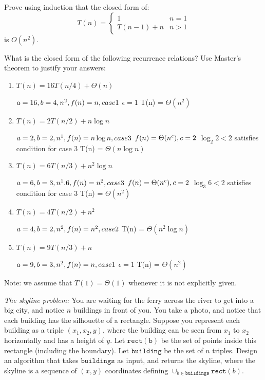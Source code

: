\documentclass{article}
\begin{document}
\nextprob
Prove using induction that the closed form of:
$$T(n) = \begin{cases}
            1        & n=1\\
            T(n-1)+n & n>1
         \end{cases}
$$
is $O(n^2)$.

\nextprob
What is the closed form of the following recurrence relations?  Use Master's
theorem to justify your answers:
\begin{enumerate}
    \item $T(n) = 16 T(n/4) + \Theta(n)$
    
    $a = 16, b = 4, n^2, f(n) = n, case  1\newline$
    $\epsilon = 1$
    T(n) =  $\Theta(n^2)$
    
    \item $T(n) = 2 T(n/2) + n \log{n}$
    
    $a = 2, b = 2, n^1, f(n) = n\log{n}, case 3\newline$
    $f(n) = \Theta(n^c), c = 2\newline$
    $\log_{2}2 < 2$ satisfies condition for case 3 \newline
    T(n) = $\Theta(n\log{n})$
    
    \item $T(n) = 6 T(n/3) + n^2 \log{n}$
    
   $a = 6, b = 3, n^1.6, f(n) = n^2, case 3\newline$
   $f(n) = \Theta(n^c), c = 2\newline$
    $\log_{3}6 < 2$ satisfies condition for case 3 \newline
    T(n) = $\Theta(n^2)$
    
    \item $T(n) = 4 T(n/2) + n^2$
    
    $a = 4, b = 2, n^2, f(n) = n^2, case 2 \newline$
    T(n) = $\Theta(n^2\log{n})$
    
    \item $T(n) = 9 T(n/3) + n$
    
    $a = 9, b = 3, n^2, f(n) = n, case 1\newline$
    $\epsilon = 1$
    T(n) = $\Theta(n^2)$
    
    
\end{enumerate}
Note: we assume that $T(1)=\Theta(1)$ whenever it is not explicitly given.

\nextprob
\emph{The skyline problem:} You are waiting for the ferry across the river to
get into a big city, and notice
$n$ buildings in front of you.  You take a photo, and notice that each building
has the silhouette of a rectangle.  Suppose you  represent each building as a
triple $(x_1,x_2,y)$, where the building can be seen from $x_1$ to $x_2$
horizontally and has a height of $y$.  Let $\mathtt{rect(b)}$ be the set of
points inside this rectangle (including the boundary).  Let $\mathtt{building}$ be the set of $n$
triples. Design an algorithm that takes $\mathtt{buildings}$ as input, and
returns the skyline, where the skyline is a sequence of $(x,y)$ coordinates
defining $\cup_{b \in \mathtt{buildings}} \mathtt{rect}(b)$.
\end{document}
